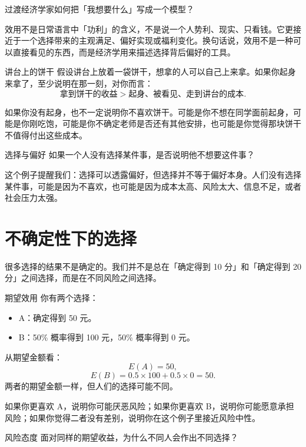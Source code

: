 \documentclass[10pt,a4paper]{ctexart}
\newcommand{\transitionnote}[1]{\begin{conceptbox}{过渡}#1\end{conceptbox}}
\begin{document}
\transitionnote{经济学家如何把「我想要什么」写成一个模型？}

效用不是日常语言中「功利」的含义，不是说一个人势利、现实、只看钱。它更接近于一个选择带来的主观满足、偏好实现或福利变化。换句话说，效用不是一种可以直接看见的东西，而是经济学用来描述选择背后偏好的工具。

\begin{examplebox}{讲台上的饼干}
假设讲台上放着一袋饼干，想拿的人可以自己上来拿。如果你起身来拿了，至少说明在那一刻，对你而言：
\[
\text{拿到饼干的收益} > \text{起身、被看见、走到讲台的成本}.
\]

如果你没有起身，也不一定说明你不喜欢饼干。可能是你不想在同学面前起身，可能是你刚吃饱，可能是你不确定老师是否还有其他安排，也可能是你觉得那块饼干不值得付出这些成本。
\end{examplebox}

\begin{discussionbox}{选择与偏好}
如果一个人没有选择某件事，是否说明他不想要这件事？
\end{discussionbox}

这个例子提醒我们：选择可以透露偏好，但选择并不等于偏好本身。人们没有选择某件事，可能是因为不喜欢，也可能是因为成本太高、风险太大、信息不足，或者社会压力太强。

\section{不确定性下的选择}

很多选择的结果不是确定的。我们并不是总在「确定得到 10 分」和「确定得到 20 分」之间选择，而是在不同风险之间选择。

\begin{examplebox}{期望效用}
你有两个选择：
\begin{itemize}
  \item A：确定得到 50 元。
  \item B：50\% 概率得到 100 元，50\% 概率得到 0 元。
\end{itemize}

从期望金额看：
\[
E(A)=50,
\]
\[
E(B)=0.5\times 100+0.5\times 0=50.
\]
两者的期望金额一样，但人们的选择可能不同。
\end{examplebox}

如果你更喜欢 A，说明你可能厌恶风险；如果你更喜欢 B，说明你可能愿意承担风险；如果你觉得二者没有差别，说明你在这个例子里接近风险中性。

\begin{discussionbox}{风险态度}
面对同样的期望收益，为什么不同人会作出不同选择？
\end{discussionbox}
\end{document}
